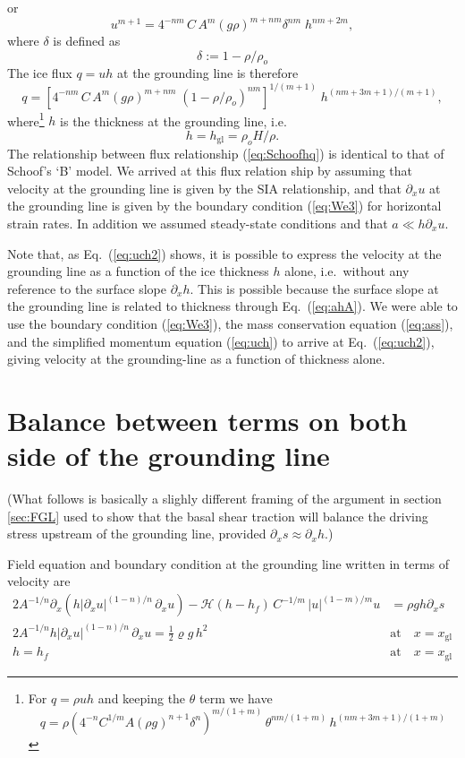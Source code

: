 \documentclass[10pt,a4paper]{book}
\newcommand{\He}{\mathcal{H}}
\newcommand{\p}{\partial}
\newcommand{\xgl}{x_{\mathrm{gl}}}
\begin{document}
or
\[
u^{m+1}=  4^{-n m}\, C \,  A^m (g \rho)^{m+n m} \delta^{n m}  \;  h^{n m + 2 m} ,
\]
where $\delta$ is defined as
\[
\delta := 1- \rho/\rho_o
\]
The ice flux  $q=uh$ at the grounding line is therefore
\begin{equation}
q=  \left [ 4^{-n m} \, C \, A^m  (g \rho)^{m+n m} \; \left (1-\rho/\rho_o \right )^{n m}  \right ]^{1/(m+1)}  \; h^{(n m + 3 m + 1)/(m+1)} ,
\label{eq:Schoofhq}
\end{equation}
where\footnote{For $q=\rho u h$ and keeping the $\theta$ term we have
\[
q=\rho  \left ( 4^{-n} C^{1/m} A (\rho g)^{n+1} \delta^n  \right )^{m/(1+m)} \, \theta^{nm/(1+m)} \,  h^{(n m +3 m+1)/(1+m)} 
\]
} $h$ is the thickness at the grounding line, i.e.
\[
h=h_{\mathrm{gl}}=\rho_o H /\rho.
\]
The relationship between flux relationship (\ref{eq:Schoofhq}) is
identical to that of Schoof's `B' model.  We arrived at this flux
relation ship by assuming that velocity at the grounding line is given
by the SIA relationship, and that $\p_x u$ at the grounding line is
given by the boundary condition (\ref{eq:We3}) for horizontal strain
rates. In addition we assumed steady-state conditions and that $a
\ll h \p_x u$.


Note that, as Eq.~(\ref{eq:uch2}) shows, it is possible to express the
velocity at the grounding line as a function of the ice thickness $h$
alone, i.e.\ without any reference to the surface slope $\p_x h$. This
is possible because the surface slope at the grounding line is related
to thickness through Eq.~(\ref{eq:ahA}). We were able to use the
boundary condition (\ref{eq:We3}), the mass conservation equation
(\ref{eq:ass}), and the simplified momentum equation (\ref{eq:uch}) to
arrive at Eq.~(\ref{eq:uch2}), giving velocity at the grounding-line
as a function of thickness alone. 


\section{Balance between terms on both side of the grounding line}

(What follows is basically a slighly different framing of the argument in
section \ref{sec:FGL} used to show that the basal shear traction will
balance the driving stress upstream of the grounding line, provided
$\p_x s \approx \p_x h$.)

Field equation and boundary condition at the
grounding line written in terms of velocity are
\begin{align}
2 A^{-1/n} \p_x \left (h |\p_x u|^{(1-n)/n} \, \p_x u \right ) - \He(h-h_f) \, C^{-1/m} \, |u|^{(1-m)/m} u & = \rho g h \p_x s  \label{eq:velssa}\\
2 A^{-1/n} h |\p_x u|^{(1-n)/n}   \, \p_x u  = \frac{1}{2} \varrho g \, h^2   \quad & \text{at} \quad x=\xgl\label{eq:bc1b} \\
h=h_f     \quad & \text{at} \quad x=\xgl\label{eq:bc2b}
\end{align}
\end{document}
